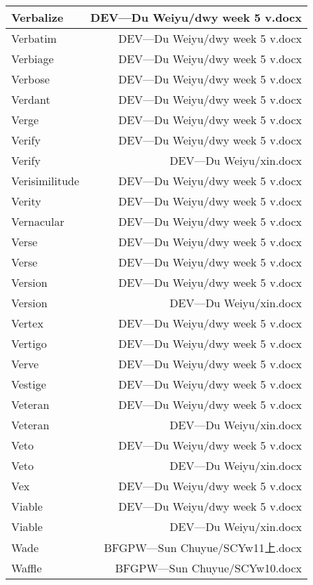 \documentclass{article}
\begin{document}
\begin{center}
\begin{longtable}{|l|r|}
\hline
Verbalize  &  DEV---Du Weiyu/dwy week 5 v.docx\\  
\hline
Verbatim  &  DEV---Du Weiyu/dwy week 5 v.docx\\  
\hline
Verbiage  &  DEV---Du Weiyu/dwy week 5 v.docx\\  
\hline
Verbose  &  DEV---Du Weiyu/dwy week 5 v.docx\\  
\hline
Verdant  &  DEV---Du Weiyu/dwy week 5 v.docx\\  
\hline
Verge  &  DEV---Du Weiyu/dwy week 5 v.docx\\  
\hline
Verify  &  DEV---Du Weiyu/dwy week 5 v.docx\\  
\hline
Verify  &  DEV---Du Weiyu/xin.docx\\  
\hline
Verisimilitude  &  DEV---Du Weiyu/dwy week 5 v.docx\\  
\hline
Verity  &  DEV---Du Weiyu/dwy week 5 v.docx\\  
\hline
Vernacular  &  DEV---Du Weiyu/dwy week 5 v.docx\\  
\hline
Verse  &  DEV---Du Weiyu/dwy week 5 v.docx\\  
\hline
Verse  &  DEV---Du Weiyu/dwy week 5 v.docx\\  
\hline
Version  &  DEV---Du Weiyu/dwy week 5 v.docx\\  
\hline
Version  &  DEV---Du Weiyu/xin.docx\\  
\hline
Vertex  &  DEV---Du Weiyu/dwy week 5 v.docx\\  
\hline
Vertigo  &  DEV---Du Weiyu/dwy week 5 v.docx\\  
\hline
Verve  &  DEV---Du Weiyu/dwy week 5 v.docx\\  
\hline
Vestige  &  DEV---Du Weiyu/dwy week 5 v.docx\\  
\hline
Veteran  &  DEV---Du Weiyu/dwy week 5 v.docx\\  
\hline
Veteran  &  DEV---Du Weiyu/xin.docx\\  
\hline
Veto  &  DEV---Du Weiyu/dwy week 5 v.docx\\  
\hline
Veto  &  DEV---Du Weiyu/xin.docx\\  
\hline
Vex  &  DEV---Du Weiyu/dwy week 5 v.docx\\  
\hline
Viable  &  DEV---Du Weiyu/dwy week 5 v.docx\\  
\hline
Viable  &  DEV---Du Weiyu/xin.docx\\  
\hline
Wade  &  BFGPW---Sun Chuyue/SCYw11上.docx\\  
\hline
Waffle  &  BFGPW---Sun Chuyue/SCYw10.docx\\  

\end{longtable}
\end{center}
\end{document}
